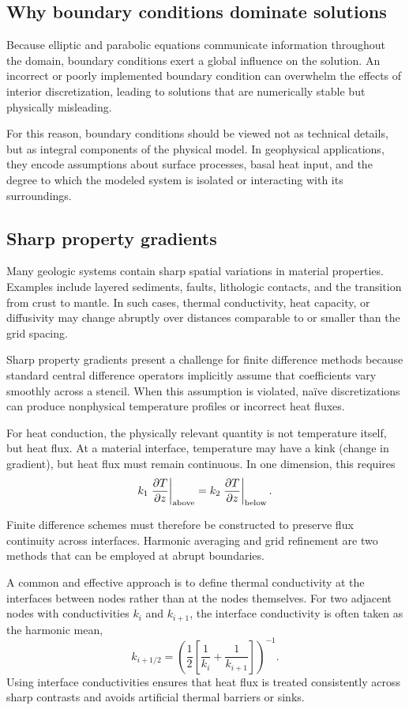 \subsection{Why boundary conditions dominate solutions}

Because elliptic and parabolic equations communicate information throughout the domain, boundary conditions exert a global influence on the solution. An incorrect or poorly implemented boundary condition can overwhelm the effects of interior discretization, leading to solutions that are numerically stable but physically misleading.

For this reason, boundary conditions should be viewed not as technical details, but as integral components of the physical model. In geophysical applications, they encode assumptions about surface processes, basal heat input, and the degree to which the modeled system is isolated or interacting with its surroundings.

\subsection{Sharp property gradients}

Many geologic systems contain sharp spatial variations in material properties.  Examples include layered sediments, faults, lithologic contacts, and the transition from crust to mantle. In such cases, thermal conductivity, heat capacity, or diffusivity may change abruptly over distances comparable to or smaller than the grid spacing.

Sharp property gradients present a challenge for finite difference methods because standard central difference operators implicitly assume that coefficients vary smoothly across a stencil. When this assumption is violated, naïve discretizations can produce nonphysical temperature profiles or incorrect heat fluxes.

For heat conduction, the physically relevant quantity is not temperature itself, but heat flux. At a material interface, temperature may have a kink (change in gradient), but heat flux must remain continuous. In one dimension, this requires
\[
    k_1 \eval{\pdv{T}{z}}_{\text{above}} = k_2 \eval{\pdv{T}{z}}_{\text{below}} .
\]

Finite difference schemes must therefore be constructed to preserve flux continuity across interfaces. Harmonic averaging and grid refinement are two methods that can be employed at abrupt boundaries.

A common and effective approach is to define thermal conductivity at the interfaces between nodes rather than at the nodes themselves. For two adjacent nodes with conductivities $k_i$ and $k_{i+1}$, the interface conductivity is often taken as the harmonic mean,
\[
    k_{i+1/2} = \left( \frac{1}{2}\left[\frac{1}{k_i} + \frac{1}{k_{i+1}}\right] \right)^{-1}.
\]
Using interface conductivities ensures that heat flux is treated consistently across sharp contrasts and avoids artificial thermal barriers or sinks.


